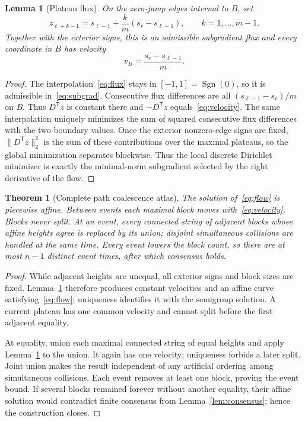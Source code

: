 \documentclass[10pt]{article}
\newtheorem{theorem}{Theorem}
\newtheorem{lemma}{Lemma}
\newcommand{\Sgn}{\operatorname{Sgn}}
\begin{document}
\begin{lemma}[Plateau flux]\label{lem:flux}
On the zero-jump edges internal to $B$, set
\begin{equation}\label{eq:flux}
 z_{\ell+k-1}=s_{\ell-1}+\frac{k}{m}(s_r-s_{\ell-1}),
 \qquad k=1,\ldots,m-1.
\end{equation}
Together with the exterior signs, this is an admissible subgradient flux and
every coordinate in $B$ has velocity
\begin{equation}\label{eq:velocity}
 v_B=\frac{s_r-s_{\ell-1}}{m}.
\end{equation}
\end{lemma}
\begin{proof}
The interpolation~\eqref{eq:flux} stays in $[-1,1]=\Sgn(0)$, so it is
admissible in~\eqref{eq:subgrad}.  Consecutive flux differences are all
$(s_{\ell-1}-s_r)/m$ on $B$.  Thus $D^{\mathsf T}z$ is constant there and
$-D^{\mathsf T}z$ equals~\eqref{eq:velocity}.  The same interpolation uniquely
minimizes the sum of squared consecutive flux differences with the two
boundary values.  Once the exterior nonzero-edge signs are fixed,
$\lVert D^{\mathsf T}z\rVert_2^2$ is the sum of these contributions over the
maximal plateaus, so the global minimization separates blockwise.  Thus the
local discrete Dirichlet minimizer is exactly the minimal-norm subgradient
selected by the right derivative of the flow.
\end{proof}

\begin{theorem}[Complete path coalescence atlas]\label{thm:atlas}
The solution of~\eqref{eq:flow} is piecewise affine.  Between events each
maximal block moves with~\eqref{eq:velocity}.  Blocks never split.  At an
event, every connected string of adjacent blocks whose affine heights agree is
replaced by its union; disjoint simultaneous collisions are handled at the
same time.  Every event lowers the block count, so there are at most $n-1$
distinct event times, after which consensus holds.
\end{theorem}
\begin{proof}
While adjacent heights are unequal, all exterior signs and block sizes are
fixed.  Lemma~\ref{lem:flux} therefore produces constant velocities and an
affine curve satisfying~\eqref{eq:flow}; uniqueness identifies it with the
semigroup solution.  A current plateau has one common velocity and cannot
split before the first adjacent equality.

At equality, union each maximal connected string of equal heights and apply
Lemma~\ref{lem:flux} to the union.  It again has one velocity; uniqueness
forbids a later split.  Joint union makes the result independent of any
artificial ordering among simultaneous collisions.  Each event removes at
least one block, proving the event bound.  If several blocks remained forever
without another equality, their affine solution would contradict finite
consensus from Lemma~\ref{lem:consensus}; hence the construction closes.
\end{proof}
\end{document}

